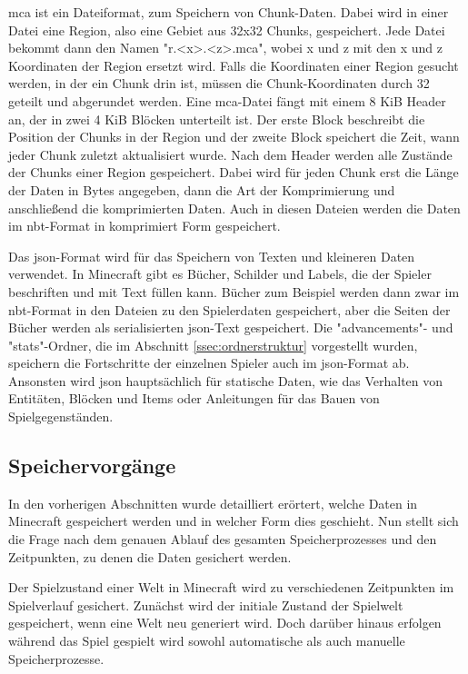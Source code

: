 \ac{mca} ist ein Dateiformat, zum Speichern von Chunk-Daten. Dabei wird in einer Datei eine Region, also eine Gebiet aus 32x32 Chunks, gespeichert. Jede Datei bekommt dann den Namen "r.<x>.<z>.mca", wobei x und z mit den x und z Koordinaten der Region ersetzt wird. Falls die Koordinaten einer Region gesucht werden, in der ein Chunk drin ist, müssen die Chunk-Koordinaten durch 32 geteilt und abgerundet werden. Eine \ac{mca}-Datei fängt mit einem 8 KiB Header an, der in zwei 4 KiB Blöcken unterteilt ist. Der erste Block beschreibt die Position der Chunks in der Region und der zweite Block speichert die Zeit, wann jeder Chunk zuletzt aktualisiert wurde. Nach dem Header werden alle Zustände der Chunks einer Region gespeichert. Dabei wird für jeden Chunk erst die Länge der Daten in Bytes angegeben, dann die Art der Komprimierung und anschließend die komprimierten Daten.\cite{minecraftRegionFile}\cite{minecraftAnvilFile} Auch in diesen Dateien werden die Daten im \ac{nbt}-Format in komprimiert Form gespeichert.\cite{minecraftNBT}

Das \ac{json}-Format wird für das Speichern von Texten und kleineren Daten verwendet. In Minecraft gibt es Bücher, Schilder und Labels, die der Spieler beschriften und mit Text füllen kann. Bücher zum Beispiel werden dann zwar im \ac{nbt}-Format in den Dateien zu den Spielerdaten gespeichert, aber die Seiten der Bücher werden als serialisierten \ac{json}-Text gespeichert.\cite{minecraftPlayerdatFormat} Die "advancements"- und "stats"-Ordner, die im Abschnitt \ref{ssec:ordnerstruktur} vorgestellt wurden, speichern die Fortschritte der einzelnen Spieler auch im \ac{json}-Format ab. Ansonsten wird \ac{json} hauptsächlich für statische Daten, wie das Verhalten von Entitäten, Blöcken und Items oder Anleitungen für das Bauen von Spielgegenständen.\cite{minecraftJSON}


\subsection{Speichervorgänge}
In den vorherigen Abschnitten wurde detailliert erörtert, welche Daten in Minecraft gespeichert werden und in welcher Form dies geschieht. Nun stellt sich die Frage nach dem genauen Ablauf des gesamten Speicherprozesses und den Zeitpunkten, zu denen die Daten gesichert werden.

Der Spielzustand einer Welt in Minecraft wird zu verschiedenen Zeitpunkten im Spielverlauf gesichert. Zunächst wird der initiale Zustand der Spielwelt gespeichert, wenn eine Welt neu generiert wird. Doch darüber hinaus erfolgen während das Spiel gespielt wird sowohl automatische als auch manuelle Speicherprozesse.\cite{minecraftSpielstandSpeicherung}

